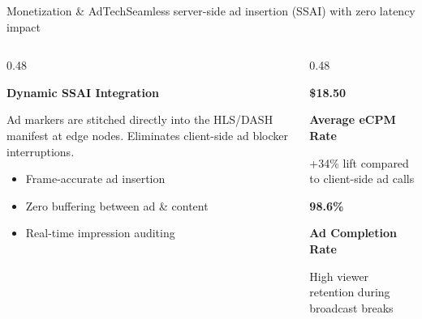 \documentclass[aspectratio=169,11pt]{beamer}
\begin{document}
\begin{frame}{Monetization \& AdTech}{Seamless server-side ad insertion (SSAI) with zero latency impact}
  \begin{columns}[T]
    \begin{column}{0.48\textwidth}
      \begin{tcolorbox}[keynotecard]
        {\bfseries\color{accentpurple}\faBullhorn\quad Dynamic SSAI Integration} \par
        \vspace{4pt}
        {\tiny\color{textmuted} Ad markers are stitched directly into the HLS/DASH manifest at edge nodes. Eliminates client-side ad blocker interruptions.}
        \vspace{6pt}
        \begin{itemize}
          \setlength{\itemsep}{2pt}
          \item[{\small\color{accentpurple}\faCheck}] {\tiny Frame-accurate ad insertion}
          \item[{\small\color{accentpurple}\faCheck}] {\tiny Zero buffering between ad \& content}
          \item[{\small\color{accentpurple}\faCheck}] {\tiny Real-time impression auditing}
        \end{itemize}
      \end{tcolorbox}
    \end{column}
    
    \begin{column}{0.48\textwidth}
      \begin{tcolorbox}[accentcard]
        \begin{center}
          {\huge\bfseries\color{accentpurple} \$18.50} \par
          \vspace{2pt}
          {\small\bfseries Average eCPM Rate} \par
          \vspace{2pt}
          {\tiny\color{textmuted} +34\% lift compared to client-side ad calls}
        \end{center}
      \end{tcolorbox}
      \vspace{2pt}
      \begin{tcolorbox}[accentcard]
        \begin{center}
          {\huge\bfseries\color{accentblue} 98.6\%} \par
          \vspace{2pt}
          {\small\bfseries Ad Completion Rate} \par
          \vspace{2pt}
          {\tiny\color{textmuted} High viewer retention during broadcast breaks}
        \end{center}
      \end{tcolorbox}
    \end{column}
  \end{columns}
\end{frame}
\end{document}
